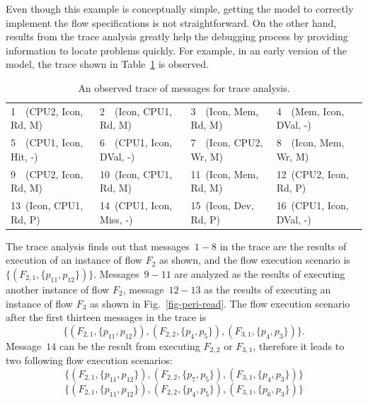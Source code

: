 \documentclass[conference]{IEEEtran}
\begin{document}
Even though this example is conceptually simple, getting the model to correctly implement the flow specifications is not straightforward.  On the other hand, results from the trace analysis greatly help the debugging process by providing information to locate problems quickly.  For example, in an early version of the model, the trace shown in Table~\ref{table-trace} is observed.  
\begin{table}
\caption{An observed trace of messages for trace analysis.}
\label{table-trace}
\begin{center}
\begin{tabular}{llll}
1~~(CPU2, Icon, Rd, M) & 2~~(Icon, CPU1, Rd, M) & 3~~(Icon, Mem, Rd, M) & 4~~(Mem,  Icon, DVal, -) \\
5~~(CPU1, Icon, Hit, -) & 6~~(CPU1, Icon, DVal, -) & 7~~(Icon, CPU2, Wr, M) & 8~~(Icon, Mem, Wr, M) \\
9~~(CPU2, Icon, Rd, M) & 10~(Icon, CPU1, Rd, M) & 11~(Icon, Mem, Rd, M) & 12~(CPU2, Icon, Rd, P) \\
13~(Icon, CPU1, Rd, P) & 14~(CPU1, Icon, Miss, -) & 15~(Icon, Dev, Rd, P) & 16~(CPU1, Icon, DVal, -) \\
\end{tabular}
\end{center}
\end{table}
The trace analysis finds out that messages~$1-8$ in the trace are the results of execution of an instance of flow $F_2$ as shown, and the flow execution scenario is $\{(F_{2,1}, \{p_{11}, p_{12}\})\}$.  Messages~$9-11$ are analyzed as the results of executing another instance of flow $F_2$, message~$12-13$ as the results of executing an instance of flow $F_3$ as shown in Fig.~\ref{fig-peri-read}.  The flow execution scenario after the first thirteen messages in the trace is 
\[
\{(F_{2,1}, \{p_{11}, p_{12}\}), (F_{2,2}, \{p_4, p_5\}), (F_{3,1}, \{p_4, p_3\})\}.
\]  
Message~$14$ can be  the result from executing $F_{2,2}$ or $F_{3,1}$, therefore it leads to two following flow execution scenarios:
\begin{equation}
\{(F_{2,1}, \{p_{11}, p_{12}\}), (F_{2,2}, \{p_7, p_5\}), (F_{3,1}, \{p_4, p_3\})\}
\end{equation}
\begin{equation}
\{(F_{2,1}, \{p_{11}, p_{12}\}), (F_{2,2}, \{p_4, p_5\}), (F_{3,1}, \{p_6, p_3\})\}
\end{equation}
\end{document}
